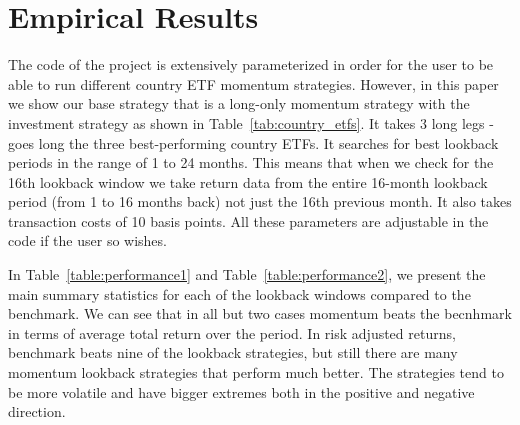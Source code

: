\documentclass[a4paper,12pt,twoside]{article}
\begin{document}
\newpage
\section{Empirical Results}

The code of the project is extensively parameterized in order for the user to be able to run different country ETF momentum strategies. However, in this paper we show our base strategy that is a long-only momentum strategy with the investment strategy as shown in Table~\ref{tab:country_etfs}. It takes 3 long legs - goes long the three best-performing country ETFs. It searches for best lookback periods in the range of 1 to 24 months. This means that when we check for the 16th lookback window we take return data from the entire 16-month lookback period (from 1 to 16 months back) not just the 16th previous month.  It also takes transaction costs of 10 basis points. All these parameters are adjustable in the code if the user so wishes.

In Table~\ref{table:performance1} and Table~\ref{table:performance2}, we present the main summary statistics for each of the lookback windows compared to the benchmark. We can see that in all but two cases momentum beats the becnhmark in terms of average total return over the period. In risk adjusted returns, benchmark beats nine of the lookback strategies, but still there are many momentum lookback strategies that perform much better. The strategies tend to be more volatile and have bigger extremes both in the positive and negative direction.
\end{document}
